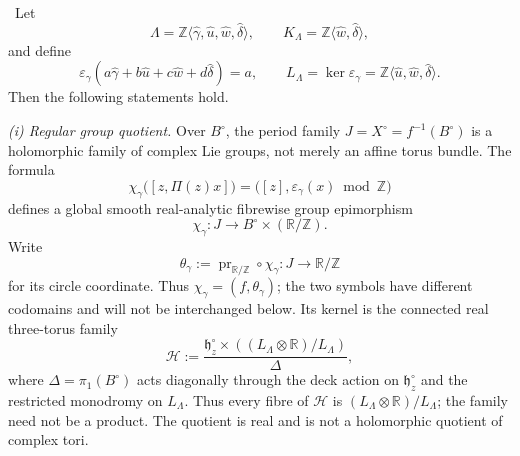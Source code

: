 \begin{theorem}
\label{cusp-spec-globalization-obstruction}
\mbox{\Verified}\ 
Let
\[
 \Lambda=\mathbb Z\langle\widehat\gamma,\widehat u,
                   \widehat w,\widehat\delta\rangle,\qquad
 K_\Lambda=\mathbb Z\langle\widehat w,\widehat\delta\rangle,
\]
and define
\[
 \varepsilon_\gamma
 (a\widehat\gamma+b\widehat u+c\widehat w+d\widehat\delta)=a,\qquad
 L_\Lambda=\ker\varepsilon_\gamma
 =\mathbb Z\langle\widehat u,\widehat w,\widehat\delta\rangle.
\tag{G.1}
\]
Then the following statements hold.

\smallskip
\noindent
\emph{(i) Regular group quotient.}
Over \(B^\circ\), the period family \(J=X^\circ=f^{-1}(B^\circ)\) is a
holomorphic family of complex Lie groups, not merely an affine torus
bundle.  The formula
\begin{equation}
 \chi_\gamma\bigl([z,\Pi(z)x]\bigr)
 =\bigl([z],\varepsilon_\gamma(x)\bmod\mathbb Z\bigr)
 \label{cusp-spec-global-circle-map}
\end{equation}
defines a global smooth real-analytic fibrewise group epimorphism
\begin{equation}
 \chi_\gamma:J\longrightarrow B^\circ\times(\mathbb R/\mathbb Z).
 \label{cusp-spec-global-circle-quotient}
\end{equation}
Write
\begin{equation}
 \theta_\gamma:=\operatorname{pr}_{\mathbb R/\mathbb Z}\circ\chi_\gamma:
 J\longrightarrow\mathbb R/\mathbb Z
 \label{cusp-spec-global-circle-coordinate}
\end{equation}
for its circle coordinate.  Thus
\(\chi_\gamma=(f,\theta_\gamma)\); the two symbols have different
codomains and will not be interchanged below.
Its kernel is the connected real three-torus family
\begin{equation}
 \mathcal H:=
 \frac{\mathfrak h_z^\circ\times
       ((L_\Lambda\otimes\mathbb R)/L_\Lambda)}{\Delta},
 \label{cusp-spec-global-kernel-family}
\end{equation}
where \(\Delta=\pi_1(B^\circ)\) acts diagonally through the deck action
on \(\mathfrak h_z^\circ\) and the restricted monodromy on
\(L_\Lambda\).  Thus every fibre of \(\mathcal H\) is
\((L_\Lambda\otimes\mathbb R)/L_\Lambda\); the family need not be a
product.
The quotient is real and is not a holomorphic quotient of complex tori.


\end{theorem}
